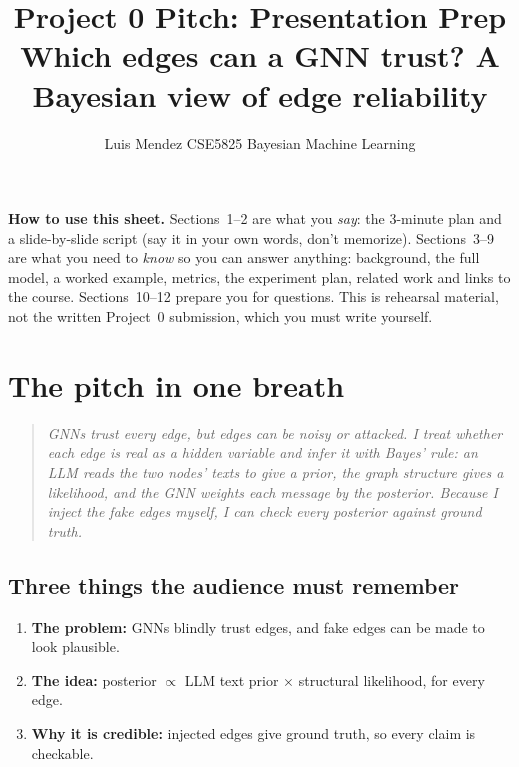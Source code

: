\documentclass[11pt]{article}
\title{Project 0 Pitch: Presentation Prep\\[4pt]
\large Which edges can a GNN trust? A Bayesian view of edge reliability}
\author{Luis Mendez \quad CSE5825 Bayesian Machine Learning}
\date{}
\newcommand{\say}[1]{\begin{quote}\itshape #1\end{quote}}
\begin{document}
\maketitle

\noindent\textbf{How to use this sheet.} Sections~1--2 are what you \emph{say}: the
3-minute plan and a slide-by-slide script (say it in your own words, don't memorize).
Sections~3--9 are what you need to \emph{know} so you can answer anything: background, the
full model, a worked example, metrics, the experiment plan, related work and links to the
course. Sections~10--12 prepare you for questions. This is rehearsal material, not the
written Project~0 submission, which you must write yourself.

\setcounter{tocdepth}{1}
\tableofcontents
\newpage

\section{The pitch in one breath}

\say{GNNs trust every edge, but edges can be noisy or attacked. I treat whether each edge is
real as a hidden variable and infer it with Bayes' rule: an LLM reads the two nodes' texts to
give a prior, the graph structure gives a likelihood, and the GNN weights each message by the
posterior. Because I inject the fake edges myself, I can check every posterior against
ground truth.}

\subsection*{Three things the audience must remember}
\begin{enumerate}
  \item \textbf{The problem:} GNNs blindly trust edges, and fake edges can be made to look
        plausible.
  \item \textbf{The idea:} posterior $\propto$ LLM text prior $\times$ structural likelihood,
        for every edge.
  \item \textbf{Why it is credible:} injected edges give ground truth, so every claim is
        checkable.
\end{enumerate}
\end{document}
